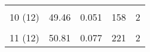 \begin{table}[H]
{\begin{tabular}{|ccccc|}
\multicolumn{1}{|c|}{\cellcolor[HTML]{C5D9F0}}                                                                                          & \multicolumn{1}{c|}{\cellcolor[HTML]{C5D9F0}}                                                                                              & \multicolumn{1}{c|}{\cellcolor[HTML]{C5D9F0}}                                                                                                      & \multicolumn{1}{c|}{\cellcolor[HTML]{C5D9F0}}                                                                                                 & \cellcolor[HTML]{C5D9F0}                             \\
\multicolumn{1}{|c|}{\multirow{-2}{*}{\cellcolor[HTML]{C5D9F0}10 (12)}}                                                                 & \multicolumn{1}{c|}{\multirow{-2}{*}{\cellcolor[HTML]{C5D9F0}49.46}}                                                                       & \multicolumn{1}{c|}{\multirow{-2}{*}{\cellcolor[HTML]{C5D9F0}0.051}}                                                                               & \multicolumn{1}{c|}{\multirow{-2}{*}{\cellcolor[HTML]{C5D9F0}158}}                                                                            & \multirow{-2}{*}{\cellcolor[HTML]{C5D9F0}2}          \\ \hline
\multicolumn{1}{|c|}{}                                                                                                                  & \multicolumn{1}{c|}{}                                                                                                                      & \multicolumn{1}{c|}{}                                                                                                                              & \multicolumn{1}{c|}{}                                                                                                                         &                                                      \\
\multicolumn{1}{|c|}{\multirow{-2}{*}{11 (12)}}                                                                                         & \multicolumn{1}{c|}{\multirow{-2}{*}{50.81}}                                                                                               & \multicolumn{1}{c|}{\multirow{-2}{*}{0.077}}                                                                                                       & \multicolumn{1}{c|}{\multirow{-2}{*}{221}}                                                                                                    & \multirow{-2}{*}{2}                                  \\ \hline

\end{tabular}}
\end{table}
